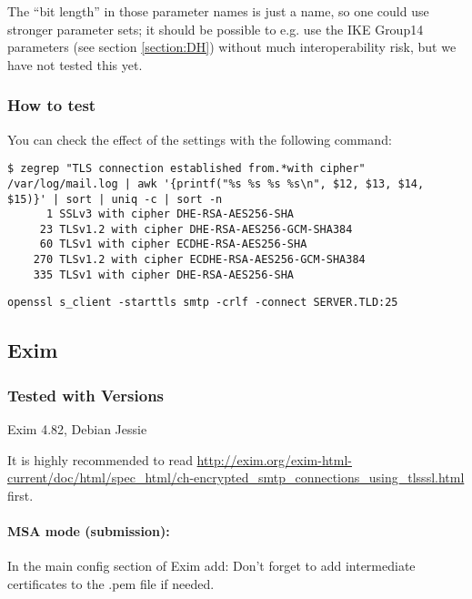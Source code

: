The ``bit length'' in those parameter names is just a name, so one
could use stronger parameter sets; it should be possible to e.g. use the
IKE Group14 parameters (see section \ref{section:DH}) without much
interoperability risk, but we have not tested this yet.



\subsubsection{How to test}
You can check the effect of the settings with the following command:
\begin{lstlisting}
$ zegrep "TLS connection established from.*with cipher" /var/log/mail.log | awk '{printf("%s %s %s %s\n", $12, $13, $14, $15)}' | sort | uniq -c | sort -n
      1 SSLv3 with cipher DHE-RSA-AES256-SHA
     23 TLSv1.2 with cipher DHE-RSA-AES256-GCM-SHA384
     60 TLSv1 with cipher ECDHE-RSA-AES256-SHA
    270 TLSv1.2 with cipher ECDHE-RSA-AES256-GCM-SHA384
    335 TLSv1 with cipher DHE-RSA-AES256-SHA
\end{lstlisting}

\begin{lstlisting}
openssl s_client -starttls smtp -crlf -connect SERVER.TLD:25
\end{lstlisting}


\subsection{Exim}

\subsubsection{Tested with Versions}
\begin{itemize*}
  \item Exim 4.82, Debian Jessie
\end{itemize*}


It is highly recommended to read
\url{http://exim.org/exim-html-current/doc/html/spec_html/ch-encrypted_smtp_connections_using_tlsssl.html}
first.

\paragraph{MSA mode (submission):}
In the main config section of Exim add:
Don't forget to add intermediate certificates to the .pem file if needed.

